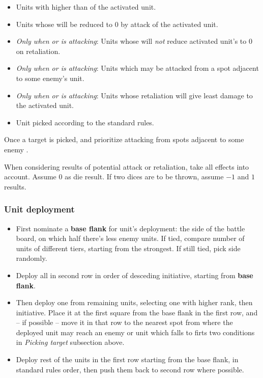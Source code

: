 \begin{multicols*}{2}
    
    \begin{itemize}
        \item Units with  higher than  of the activated unit.
        \item Units whose  will be reduced to $0$ by attack of the activated unit.
        \item \textit{Only when  or  is attacking}: Units whose will \emph{not} reduce activated unit's  to $0$ on retaliation.
        \item \textit{Only when  or  is attacking}: Units which may be attacked from a spot adjacent to some enemy's  unit.
        \item \textit{Only when  or  is attacking}: Units whose retaliation will give least damage to the activated unit.
        \item Unit picked according to the standard rules.
    \end{itemize}
    
    Once a target is picked,  and  prioritize attacking from spots adjacent to some enemy .
   
    When considering results of potential attack or retaliation, take all effects into account.  Assume $0$ as die result. If two dices are to be thrown, assume $-1$ and $1$ results.
    
    \subsubsection*{Unit deployment}
    
    \begin{itemize}
        \item First nominate a \textbf{base flank} for unit's deployment: the side of the battle board, on which half there's less enemy units. If tied, compare number of units of different tiers, starting from the strongest. If still tied, pick side randomly.
        \item Deploy all  in second row in order of desceding initiative, starting from \textbf{base flank}.
        \item Then deploy one from remaining units, selecting one with higher rank, then initiative. Place it at the first square from the base flank in the first row, and -- if possible -- move it in that row to the nearest spot from where the deployed unit may reach an enemy  or unit which falls to firts two conditions in \textit{Picking target} subsection above.
        \item Deploy rest of the units in the first row starting from the base flank, in standard rules order, then push them back to second row where possible.
    \end{itemize}
    

\end{multicols*}
